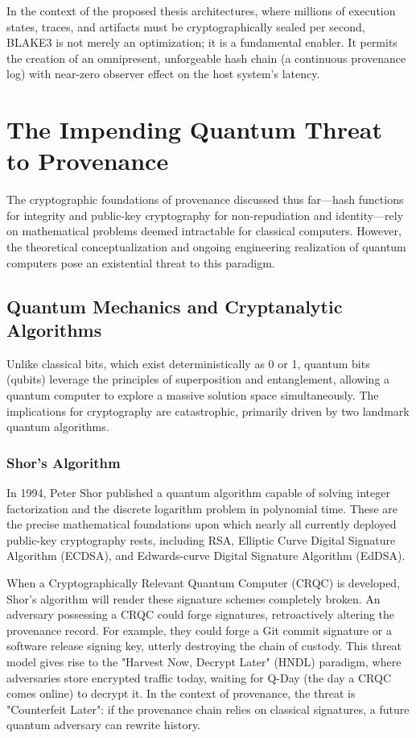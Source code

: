 In the context of the proposed thesis architectures, where millions of execution states, traces, and artifacts must be cryptographically sealed per second, BLAKE3 is not merely an optimization; it is a fundamental enabler. It permits the creation of an omnipresent, unforgeable hash chain (a continuous provenance log) with near-zero observer effect on the host system's latency.

\section{The Impending Quantum Threat to Provenance}
\label{sec:quantum_threat}

The cryptographic foundations of provenance discussed thus far—hash functions for integrity and public-key cryptography for non-repudiation and identity—rely on mathematical problems deemed intractable for classical computers. However, the theoretical conceptualization and ongoing engineering realization of quantum computers pose an existential threat to this paradigm.

\subsection{Quantum Mechanics and Cryptanalytic Algorithms}
Unlike classical bits, which exist deterministically as 0 or 1, quantum bits (qubits) leverage the principles of superposition and entanglement, allowing a quantum computer to explore a massive solution space simultaneously. The implications for cryptography are catastrophic, primarily driven by two landmark quantum algorithms.

\subsubsection{Shor's Algorithm}
In 1994, Peter Shor published a quantum algorithm capable of solving integer factorization and the discrete logarithm problem in polynomial time. These are the precise mathematical foundations upon which nearly all currently deployed public-key cryptography rests, including RSA, Elliptic Curve Digital Signature Algorithm (ECDSA), and Edwards-curve Digital Signature Algorithm (EdDSA).

When a Cryptographically Relevant Quantum Computer (CRQC) is developed, Shor's algorithm will render these signature schemes completely broken. An adversary possessing a CRQC could forge signatures, retroactively altering the provenance record. For example, they could forge a Git commit signature or a software release signing key, utterly destroying the chain of custody. This threat model gives rise to the "Harvest Now, Decrypt Later" (HNDL) paradigm, where adversaries store encrypted traffic today, waiting for Q-Day (the day a CRQC comes online) to decrypt it. In the context of provenance, the threat is "Counterfeit Later": if the provenance chain relies on classical signatures, a future quantum adversary can rewrite history.

